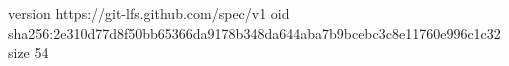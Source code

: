 version https://git-lfs.github.com/spec/v1
oid sha256:2e310d77d8f50bb65366da9178b348da644aba7b9bcebc3c8e11760e996c1c32
size 54
